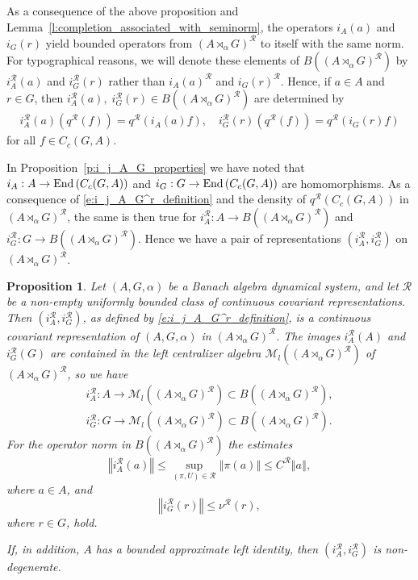 \documentclass{amsart}
\theoremstyle{plain}
\newtheorem{prop}[theorem]{Proposition}
\theoremstyle{definition}
\numberwithin{equation}{section}
\begin{document}
As a consequence of the above proposition and Lemma~\ref{l:completion_associated_with_seminorm}, the operators $i_A(a)$ and $i_G(r)$ yield bounded operators from ${(A {\rtimes}_\alpha G)^\mathcal{R}}$ to itself with the same norm. For typographical reasons, we will denote these elements of $B({(A {\rtimes}_\alpha G)^\mathcal{R}})$ by $i_A^{\mathcal R}(a)$ and $i_G^{\mathcal R}(r)$ rather than $i_A(a)^{\mathcal R}$ and $i_G(r)^{\mathcal R}$. Hence, if $a \in A$ and $r \in G$, then $i_A^{\mathcal R}(a), \; i_G^{\mathcal R}(r) \in B({(A {\rtimes}_\alpha G)^\mathcal{R}})$ are determined by
\begin{align}\label{e:i_j_A_G^r_definition}
i_A^{\mathcal R}(a)({q^{\mathcal R}}(f))={q^{\mathcal R}}(i_A(a)f), \quad i_G^{\mathcal R}(r)({q^{\mathcal R}}(f)) = {q^{\mathcal R}}(i_G(r)f)
\end{align}
for all $f\in C_c(G,A)$.

In Proposition~\ref{p:i_j_A_G_properties} we have noted that $i_A: A \to {\textup{End\,}} (C_c(G,A))$ and $i_G: G \to {\textup{End\,}} (C_c(G,A))$ are homomorphisms. As a consequence of \eqref{e:i_j_A_G^r_definition} and the density of ${q^{\mathcal R}}(C_c(G,A))$ in ${(A {\rtimes}_\alpha G)^\mathcal{R}}$, the same is then true for $i_A^{\mathcal R} : A \to B({(A {\rtimes}_\alpha G)^\mathcal{R}})$ and $i_G^{\mathcal R}: G \to B({(A {\rtimes}_\alpha G)^\mathcal{R}})$. Hence we have a pair of representations $(i_A^{\mathcal R}, i_G^{\mathcal R})$ on ${(A {\rtimes}_\alpha G)^\mathcal{R}}$.

\begin{prop}\label{p:covariant_representation_on_crossed_product}
Let ${(A,G,\alpha)}$ be a Banach algebra dynamical system, and let $\mathcal{R}$ be a non-empty uniformly bounded class of continuous covariant representations. Then $(i_A^{\mathcal R}, i_G^{\mathcal R})$, as defined by \eqref{e:i_j_A_G^r_definition}, is a continuous covariant representation of ${(A,G,\alpha)}$ in ${(A {\rtimes}_\alpha G)^\mathcal{R}}$. The images $i_A^{\mathcal R}(A)$ and $i_G^{\mathcal R}(G)$ are contained in the left centralizer algebra $\mathcal M_l({(A {\rtimes}_\alpha G)^\mathcal{R}})$ of ${(A {\rtimes}_\alpha G)^\mathcal{R}}$, so we have
\begin{align*}
 i_A^{\mathcal R}: A \to \mathcal M_l({(A {\rtimes}_\alpha G)^\mathcal{R}}) \subset B({(A {\rtimes}_\alpha G)^\mathcal{R}}), \\
 i_G^{\mathcal R}: G \to \mathcal M_l({(A {\rtimes}_\alpha G)^\mathcal{R}}) \subset B({(A {\rtimes}_\alpha G)^\mathcal{R}}).
\end{align*}
 For the operator norm in $B({(A {\rtimes}_\alpha G)^\mathcal{R}})$ the estimates
\[ {\left\Vert {i_A^{\mathcal R}(a)} \right\Vert} \leq \sup_{{(\pi,U)}\in{\mathcal R}} {\left\Vert {\pi(a)} \right\Vert}\leq {{C^{\mathcal R}}}{\left\Vert {a} \right\Vert}, \]
where $a\in A$,
and
\[ {\left\Vert {i_G^{\mathcal R}(r)} \right\Vert} \leq {\nu^{\mathcal R}}(r),\]
where $r\in G$, hold.

If, in addition, $A$ has a bounded approximate left identity, then $(i_A^{\mathcal R}, i_G^{\mathcal R})$ is non-degenerate.

\end{prop}
\end{document}
